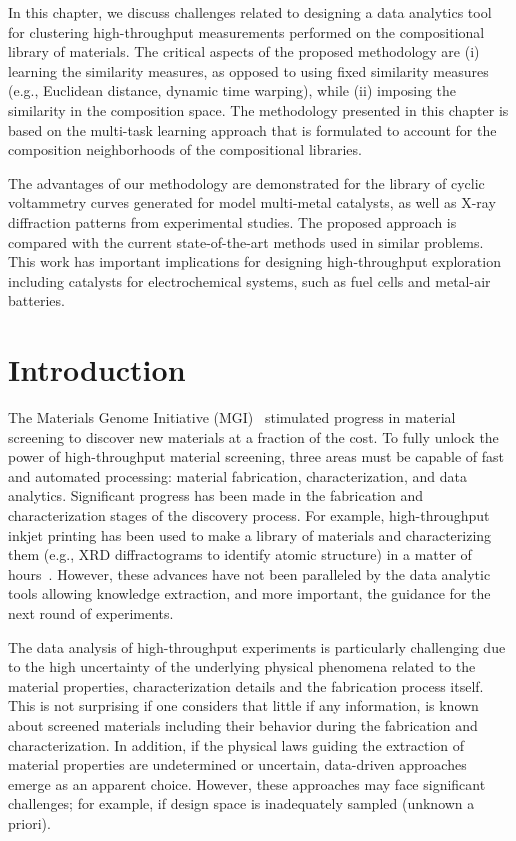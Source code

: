 In this chapter, we discuss challenges related to designing a data analytics tool for clustering high-throughput measurements performed on the compositional library of materials. 
The critical aspects of the proposed methodology are (i) learning the similarity measures, as opposed to using fixed similarity measures (e.g., Euclidean distance, dynamic time warping), while (ii) imposing the similarity in the composition space. 
The methodology presented in this chapter is based on the multi-task learning approach that is formulated to account for the composition neighborhoods of the compositional libraries.

The advantages of our methodology are demonstrated for the library of cyclic voltammetry curves generated for model multi-metal catalysts, as well as X-ray diffraction patterns from experimental studies.
The proposed approach is compared with the current state-of-the-art methods used in similar problems. 
This work has important implications for designing high-throughput exploration including catalysts for electrochemical systems, such as fuel cells and metal-air batteries. 

\section{Introduction}
The Materials Genome Initiative (MGI)~\cite{white2012materials,green2017fulfilling} stimulated progress in material screening to discover new materials at a fraction of the cost.  
To fully unlock the power of high-throughput material screening, three areas must be capable of fast and automated processing: material fabrication, characterization, and data analytics.
Significant progress has been made in the fabrication and characterization stages of the discovery process. 
For example, high-throughput inkjet printing has been used to make a library of materials and characterizing them (e.g., XRD diffractograms to identify atomic structure) in a matter of hours~\cite{koinuma2004combinatorial,takeuchi2002combinatorial}.
However, these advances have not been paralleled by the data analytic tools allowing knowledge extraction, and more important, the guidance for the next round of experiments. 

The data analysis of high-throughput experiments is particularly challenging due to the high uncertainty of the underlying physical phenomena related to the material properties, characterization details and the fabrication process itself. 
This is not surprising if one considers that little if any information, is known about screened materials including their behavior during the fabrication and characterization. 
In addition, if the physical laws guiding the extraction of material properties are undetermined or uncertain, data-driven approaches emerge as an apparent choice. However, these approaches may face significant challenges; for example, if design space is inadequately sampled (unknown a priori).  

